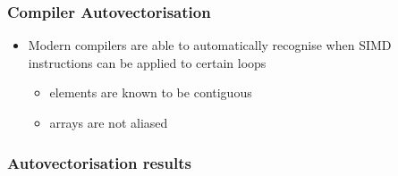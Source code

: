 \subsubsection{Compiler
Autovectorisation}\label{compiler-autovectorisation}

\begin{itemize}
\itemsep1pt\parskip0pt
\item
  Modern compilers are able to automatically recognise when SIMD
  instructions can be applied to certain loops

  \begin{itemize}
  \itemsep1pt\parskip0pt
  \item
    elements are known to be contiguous
  \item
    arrays are not aliased
  \end{itemize}
\end{itemize}

\begin{Shaded}
\begin{Highlighting}[]

      
                 
     \NormalTok{)}
         \NormalTok{;}

      \NormalTok{) \{}
         \NormalTok{(} 
    \NormalTok{\}}
     \NormalTok{\{}
         \NormalTok{(} 
    \NormalTok{\}}

     \NormalTok{;}
\NormalTok{\}}
\end{Highlighting}
\end{Shaded}

\subsubsection{Autovectorisation
results}\label{autovectorisation-results}

